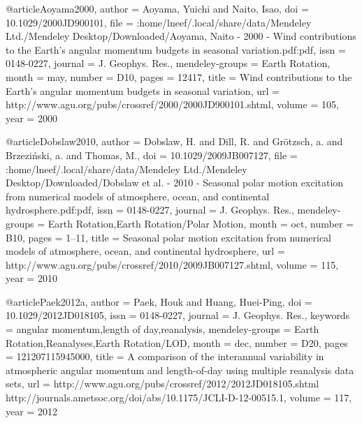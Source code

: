 @article{Aoyama2000,
author = {Aoyama, Yuichi and Naito, Isao},
doi = {10.1029/2000JD900101},
file = {:home/lneef/.local/share/data/Mendeley Ltd./Mendeley 
Desktop/Downloaded/Aoyama, Naito - 2000 - Wind contributions to the Earth's 
angular momentum budgets in seasonal variation.pdf:pdf},
issn = {0148-0227},
journal = {J. Geophys. Res.},
mendeley-groups = {Earth Rotation},
month = may,
number = {D10},
pages = {12417},
title = {{Wind contributions to the Earth's angular momentum budgets in seasonal 
variation}},
url = {http://www.agu.org/pubs/crossref/2000/2000JD900101.shtml},
volume = {105},
year = {2000}
}

@article{Dobslaw2010,
author = {Dobslaw, H. and Dill, R. and Gr\"{o}tzsch, a. and Brzeziński, a. and 
Thomas, M.},
doi = {10.1029/2009JB007127},
file = {:home/lneef/.local/share/data/Mendeley Ltd./Mendeley 
Desktop/Downloaded/Dobslaw et al. - 2010 - Seasonal polar motion excitation from 
numerical models of atmosphere, ocean, and continental hydrosphere.pdf:pdf},
issn = {0148-0227},
journal = {J. Geophys. Res.},
mendeley-groups = {Earth Rotation,Earth Rotation/Polar Motion},
month = oct,
number = {B10},
pages = {1--11},
title = {{Seasonal polar motion excitation from numerical models of atmosphere, 
ocean, and continental hydrosphere}},
url = {http://www.agu.org/pubs/crossref/2010/2009JB007127.shtml},
volume = {115},
year = {2010}
}

@article{Paek2012a,
author = {Paek, Houk and Huang, Huei-Ping},
doi = {10.1029/2012JD018105},
issn = {0148-0227},
journal = {J. Geophys. Res.},
keywords = {angular momentum,length of day,reanalysis},
mendeley-groups = {Earth Rotation,Reanalyses,Earth Rotation/LOD},
month = dec,
number = {D20},
pages = {121207115945000},
title = {{A comparison of the interannual variability in atmospheric angular 
momentum and length-of-day using multiple reanalysis data sets}},
url = {http://www.agu.org/pubs/crossref/2012/2012JD018105.shtml 
http://journals.ametsoc.org/doi/abs/10.1175/JCLI-D-12-00515.1},
volume = {117},
year = {2012}
}


